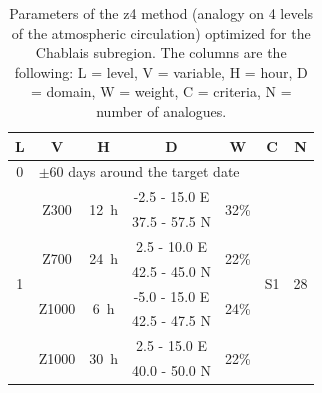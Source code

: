 \documentclass[twocol]{ametsoc}
\begin{document}
\begin{table}[htbp]
	\footnotesize
	\caption{Parameters of the z4 method (analogy on 4 levels of the atmospheric circulation) optimized for the Chablais subregion. The columns are the following: L = level, V = variable, H = hour, D = domain, W = weight, C = criteria, N = number of analogues.}
	\begin{center}
		\begin{tabular}{ccccccc}
			\hline \textbf{L} & \textbf{V} & \textbf{H} & \textbf{D} & \textbf{W} & \textbf{C} & \textbf{N} \\ 
			\hline 
			0 & \multicolumn{6}{l}{$\pm 60$ days around the target date} \\
			\hline 
			\multirow{8}{*}{1} &  \multirow{2}{*}{Z300} & \multirow{2}{*}{12~h} & -2.5 - 15.0 \degree E & \multirow{2}{*}{32\%} & \multirow{8}{*}{S1} & \multirow{8}{*}{28} \\
			& & & 37.5 - 57.5 \degree N & & & \\ 
			& \multirow{2}{*}{Z700} & \multirow{2}{*}{24~h} & 2.5 - 10.0 \degree E & \multirow{2}{*}{22\%} & & \\ 
			& & & 42.5 - 45.0 \degree N & & & \\ 
			& \multirow{2}{*}{Z1000} & \multirow{2}{*}{6~h} & -5.0 - 15.0 \degree E & \multirow{2}{*}{24\%} & & \\ 
			& & & 42.5 - 47.5 \degree N & & & \\ 
			& \multirow{2}{*}{Z1000} & \multirow{2}{*}{30~h} & 2.5 - 15.0 \degree E & \multirow{2}{*}{22\%} & & \\ 
			& & & 40.0 - 50.0 \degree N & & & \\ 
			\hline 
		\end{tabular} 
	\end{center}
	\label{table:params_GA_z4}
\end{table}
\end{document}
